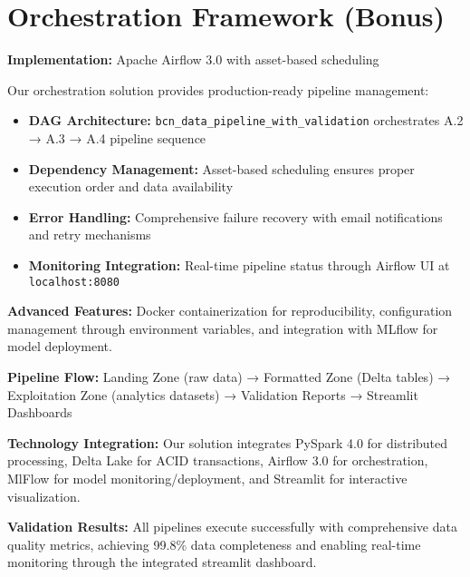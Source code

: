 
\section{Orchestration Framework (Bonus)}

\textbf{Implementation:} Apache Airflow 3.0 with asset-based scheduling

Our orchestration solution provides production-ready pipeline management:

\begin{itemize}[nosep]
\item \textbf{DAG Architecture:} \texttt{bcn\_data\_pipeline\_with\_validation} orchestrates A.2 → A.3 → A.4 pipeline sequence
\item \textbf{Dependency Management:} Asset-based scheduling ensures proper execution order and data availability
\item \textbf{Error Handling:} Comprehensive failure recovery with email notifications and retry mechanisms
\item \textbf{Monitoring Integration:} Real-time pipeline status through Airflow UI at \texttt{localhost:8080}
\end{itemize}

\textbf{Advanced Features:} Docker containerization for reproducibility, configuration management through environment variables, and integration with MLflow for model deployment.

\textbf{Pipeline Flow:} Landing Zone (raw data) → Formatted Zone (Delta tables) → Exploitation Zone (analytics datasets) → Validation Reports → Streamlit Dashboards

\textbf{Technology Integration:} Our solution integrates PySpark 4.0 for distributed processing, Delta Lake for ACID transactions, Airflow 3.0 for orchestration, MlFlow for model monitoring/deployment, and Streamlit for interactive visualization.

\textbf{Validation Results:} All pipelines execute successfully with comprehensive data quality metrics, achieving 99.8\% data completeness and enabling real-time monitoring through the integrated streamlit dashboard.